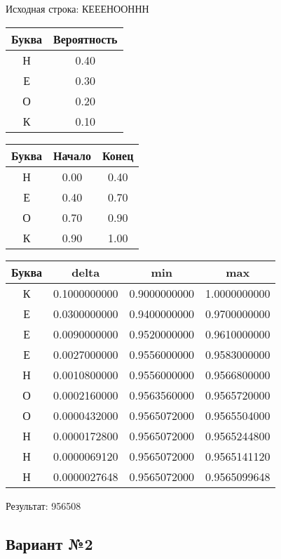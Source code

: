\documentclass[a4paper, 12pt]{article}
\begin{document}
Исходная строка: КЕЕЕНООННН\
\begin{center}
 \begin{tabular}{ |c|c| } 
  \hline
     Буква & Вероятность \\ \hline
Н & 0.40\\\hline
Е & 0.30\\\hline
О & 0.20\\\hline
К & 0.10
\\ \hline \end{tabular}
\end{center}
\begin{center}
 \begin{tabular}{ |c|c|c| } 
  \hline
     Буква & Начало & Конец \\ \hline
Н & 0.00 & 0.40\\\hline
Е & 0.40 & 0.70\\\hline
О & 0.70 & 0.90\\\hline
К & 0.90 & 1.00
\\ \hline \end{tabular}
\end{center}
\begin{center}
 \begin{tabular}{ |c|c|c|c| } 
  \hline
     Буква & delta & min & max \\ \hline
К & 0.1000000000 & 0.9000000000 & 1.0000000000\\\hline
Е & 0.0300000000 & 0.9400000000 & 0.9700000000\\\hline
Е & 0.0090000000 & 0.9520000000 & 0.9610000000\\\hline
Е & 0.0027000000 & 0.9556000000 & 0.9583000000\\\hline
Н & 0.0010800000 & 0.9556000000 & 0.9566800000\\\hline
О & 0.0002160000 & 0.9563560000 & 0.9565720000\\\hline
О & 0.0000432000 & 0.9565072000 & 0.9565504000\\\hline
Н & 0.0000172800 & 0.9565072000 & 0.9565244800\\\hline
Н & 0.0000069120 & 0.9565072000 & 0.9565141120\\\hline
Н & 0.0000027648 & 0.9565072000 & 0.9565099648
\\ \hline \end{tabular}
\end{center}
Результат: 956508
\pagebreak
\subsection{Вариант №2}
\end{document}
